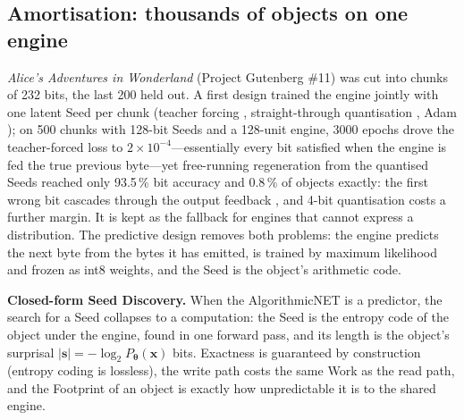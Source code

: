 \documentclass[11pt,a4paper]{article}
\theoremstyle{definition}
\theoremstyle{plain}
\theoremstyle{remark}
\newcommand{\anet}{AlgorithmicNET}
\newcommand{\seed}{\mathbf{s}}
\newcommand{\weights}{\bm{\theta}}
\newcommand{\file}{\mathbf{x}}
\begin{document}
\subsection{Amortisation: thousands of objects on one engine}
\label{sec:amort}
\emph{Alice's Adventures in Wonderland} (Project Gutenberg \#11) was cut into
\corpusChunks{} chunks of 232 bits, the last 200 held out. A first design trained the engine
jointly with one latent Seed per chunk (teacher forcing \citep{williams1989}, straight-through
quantisation \citep{bengio2013ste}, Adam \citep{kingma2015adam}); on 500 chunks with 128-bit Seeds and a 128-unit engine, 3000 epochs drove the teacher-forced
loss to $2\times10^{-4}$---essentially every bit satisfied when the engine is fed the true previous
byte---yet free-running regeneration from the quantised Seeds reached only 93.5\,\% bit accuracy
and 0.8\,\% of objects exactly: the first wrong bit cascades through the output feedback
\citep{ranzato2016}, and 4-bit quantisation costs a further margin. It is kept as the fallback for engines that
cannot express a distribution. The predictive design removes both problems: the engine predicts
the next byte from the bytes it has emitted, is trained by maximum likelihood and frozen as int8
weights, and the Seed is the object's arithmetic code.

\begin{keyinsight}
\textbf{Closed-form Seed Discovery.} When the \anet{} is a predictor, the search for a Seed
collapses to a computation: the Seed is the entropy code of the object under the engine, found in
one forward pass, and its length is the object's surprisal $|\seed|=-\log_2 P_{\weights}(\file)$
bits. Exactness is guaranteed by construction (entropy coding is lossless), the write path costs
the same Work as the read path, and the Footprint of an object is exactly how unpredictable it is
to the shared engine.
\end{keyinsight}

\begin{table}[!htb]
\centering\small
\caption{Predictive engine on the Alice corpus: per-object Footprint against corpus size $M$
(int8 weights amortised over $M$ objects $+$ mean Seed; ``ideal'' is the information-theoretic
Seed length, ``coded'' the range-coder output with its 32-bit flush). All chunks regenerate
bit-exactly; held-out chunks were never trained on.}
\label{tab:designB}
{\footnotesize\designBTable{}}
\end{table}
\end{document}
